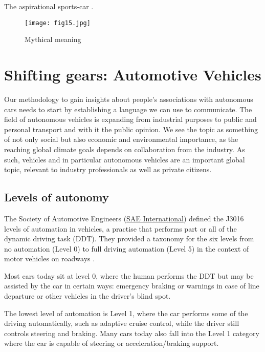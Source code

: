 \documentclass[12pt, usenames, dvipsnames]{report}
\begin{document}
\begin{flushleft}
The aspirational sports-car \cite{giacomin2020}.

\vspace*{1.2em}
\begin{figure}[!htbp]
  \hspace*{5em}
  \texttt{[image: fig15.jpg]}
  \caption{Mythical meaning}
  \label{fig:figure15}
\end{figure}
\vspace*{1.2em}


\section{Shifting gears: Automotive Vehicles}

Our methodology to gain insights about people's associations with autonomous cars needs to start by establishing a language we can use to communicate. 
The field of autonomous vehicles is expanding from industrial purposes to public and personal transport and with it the public opinion.
We see the topic as something of not only social but also economic and environmental importance, as the reaching global climate goals depends on collaboration from the industry. 
As such, vehicles and in particular autonomous vehicles are an important global topic, relevant to industry professionals as well as private citizens.

\subsection{Levels of autonomy}

The Society of Automotive Engineers (\href{https://www.sae.org/standards/content/j3016_201806/}{SAE International}) defined the J3016 levels of automation in vehicles, a practise that performs part or all of the dynamic driving task (DDT).
They provided a taxonomy for the six levels from no automation (Level 0) to full driving automation (Level 5) in the context of motor vehicles on roadways \cite{sae2018}. 

Most cars today sit at level 0, where the human performs the DDT but may be assisted by the car in certain ways: emergency braking or warnings in case of line departure or other vehicles in the driver's blind spot.

The lowest level of automation is Level 1, where the car performs some of the driving automatically, such as adaptive cruise control, while the driver still controls steering and braking.
Many cars today also fall into the Level 1 category where the car is capable of steering or acceleration/braking support.


\end{flushleft}
\end{document}
